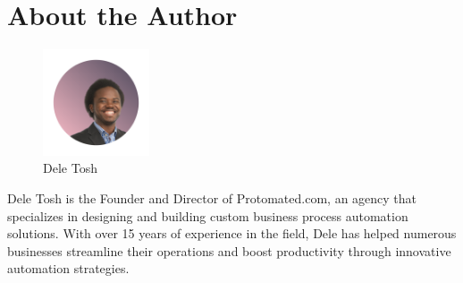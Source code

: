 \chapter*{About the Author}

\begin{figure}
    \centering
    \includegraphics[width=0.28\textwidth]{figures/deletosh - bio}
    \caption*{Dele Tosh}
\end{figure}

Dele Tosh is the Founder and Director of Protomated.com, an agency that specializes in designing and building custom business process automation solutions. With over 15 years of experience in the field, Dele has helped numerous businesses streamline their operations and boost productivity through innovative automation strategies.

\clearpage